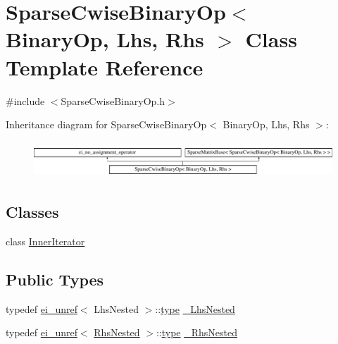 \hypertarget{class_sparse_cwise_binary_op}{\section{Sparse\-Cwise\-Binary\-Op$<$ Binary\-Op, Lhs, Rhs $>$ Class Template Reference}
\label{class_sparse_cwise_binary_op}
}


{\ttfamily \#include $<$Sparse\-Cwise\-Binary\-Op.\-h$>$}

Inheritance diagram for Sparse\-Cwise\-Binary\-Op$<$ Binary\-Op, Lhs, Rhs $>$\-:\begin{figure}[H]
\begin{center}
\leavevmode
\includegraphics[height=1.359223cm]{class_sparse_cwise_binary_op}
\end{center}
\end{figure}
\subsection*{Classes}
\begin{DoxyCompactItemize}
\item 
class \hyperlink{class_sparse_cwise_binary_op_1_1_inner_iterator}{Inner\-Iterator}
\end{DoxyCompactItemize}
\subsection*{Public Types}
\begin{DoxyCompactItemize}
\item 
typedef \hyperlink{structei__unref}{ei\-\_\-unref}$<$ Lhs\-Nested $>$\-::\hyperlink{glext_8h_a7d05960f4f1c1b11f3177dc963a45d86}{type} \hyperlink{class_sparse_cwise_binary_op_a33b189ff88f95c7bfe920b8e9b0d42c6}{\-\_\-\-Lhs\-Nested}
\item 
typedef \hyperlink{structei__unref}{ei\-\_\-unref}$<$ \hyperlink{class_sparse_cwise_binary_op_ad4e1071aee8d4d88215fe279cf510d84}{Rhs\-Nested} $>$\-::\hyperlink{glext_8h_a7d05960f4f1c1b11f3177dc963a45d86}{type} \hyperlink{class_sparse_cwise_binary_op_a33c5e3664f2a45c70c0821cfb875f20b}{\-\_\-\-Rhs\-Nested}
\end{DoxyCompactItemize}
